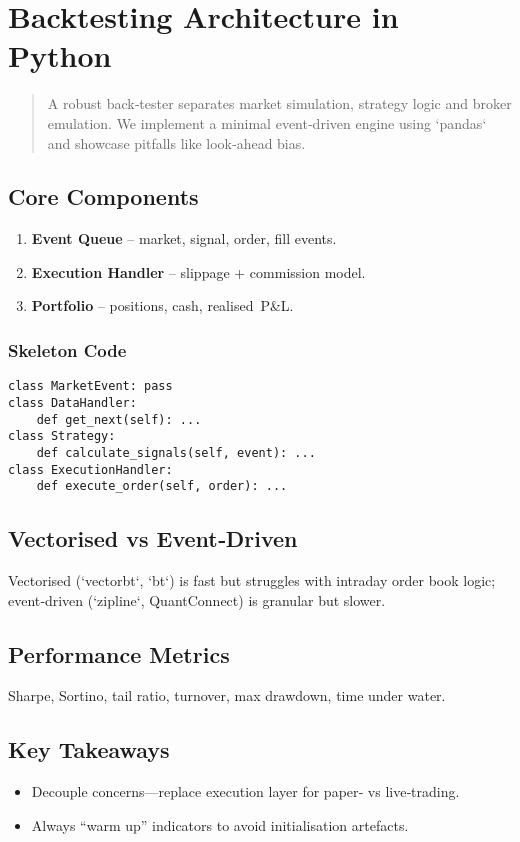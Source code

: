 \chapter{Backtesting Architecture in Python}\label{ch:backtest}

\begin{abstract}
A robust back‑tester separates market simulation, strategy logic and
broker emulation.  We implement a minimal event‑driven engine using
`pandas` and showcase pitfalls like look‑ahead bias.
\end{abstract}

\section{Core Components}

\begin{enumerate}
  \item \textbf{Event Queue} – market, signal, order, fill events.
  \item \textbf{Execution Handler} – slippage + commission model.
  \item \textbf{Portfolio} – positions, cash, realised P\&L.
\end{enumerate}

\subsection*{Skeleton Code}

\begin{verbatim}
class MarketEvent: pass
class DataHandler:
    def get_next(self): ...
class Strategy:
    def calculate_signals(self, event): ...
class ExecutionHandler:
    def execute_order(self, order): ...
\end{verbatim}

\section{Vectorised vs Event‑Driven}

Vectorised (`vectorbt`, `bt`) is fast but struggles with intraday order
book logic; event‑driven (`zipline`, QuantConnect) is granular but slower.

\section{Performance Metrics}

Sharpe, Sortino, tail ratio, turnover, max drawdown, time under water.

\section*{Key Takeaways}
\begin{itemize}
  \item Decouple concerns—replace execution layer for paper‑ vs live‑trading.
  \item Always “warm up” indicators to avoid initialisation artefacts.
\end{itemize}
